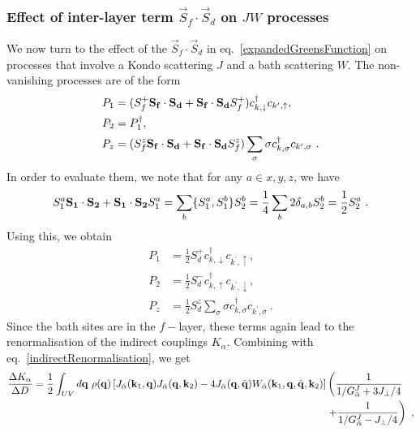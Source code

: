 \documentclass[%
reprint,
superscriptaddress,
groupedaddress,
superscriptaddress,
onecolumn,
10pt
]{revtex4-2}
\begin{document}
\subsubsection*{Effect of inter-layer term \(\vec{S}_f\cdot\vec{S}_d\) on \(JW\) processes}
We now turn to the effect of the \(\vec{S}_f\cdot\vec{S}_d\) in eq.~\ref{expandedGreensFunction} on processes that involve a Kondo scattering \(J\) and a bath scattering \(W\). The non-vanishing processes are of the form
\begin{equation}\begin{aligned}
	P_1 &= (S_f^+ {\bf S_f}\cdot {\bf S_d} + {\bf S_f}\cdot {\bf S_d}S_f^+ )c^\dagger_{k,\downarrow}c_{k^\prime,\uparrow},\\
	P_2 &= P_1^\dagger,\\
	P_z &= (S_f^z {\bf S_f}\cdot {\bf S_d} + {\bf S_f}\cdot {\bf S_d}S_f^z )\sum_\sigma \sigma c^\dagger_{k,\sigma}c_{k^\prime,\sigma}~.
\end{aligned}\end{equation}
In order to evaluate them, we note that for any \(a\in{x,y,z}\), we have
\begin{equation}\begin{aligned}
	S_1^a {\bf S_1}\cdot {\bf S_2} + {\bf S_1}\cdot {\bf S_2} S_1^a = \sum_b \{S_1^a, S_1^b\}S_2^b = \frac{1}{4}\sum_b 2 \delta_{a,b} S_2^b = \frac{1}{2}S_2^a~.
\end{aligned}\end{equation}
Using this, we obtain
\begin{equation}\begin{aligned}
	P_1 &= \frac{1}{2}S_d^+c^\dagger_{k,\downarrow}c_{k^\prime,\uparrow},\\
	P_2 &= \frac{1}{2}S_d^-c^\dagger_{k,\uparrow}c_{k^\prime,\downarrow},\\
	P_z &= \frac{1}{2}S_d^z \sum_\sigma \sigma c^\dagger_{k,\sigma}c_{k^\prime,\sigma}~.
\end{aligned}\end{equation}
Since the bath sites are in the \(f-\)layer, these terms again lead to the renormalisation of the indirect couplings \(K_\alpha\). Combining with eq.~\ref{indirectRenormalisation}, we get
\begin{equation}\begin{aligned}\label{indirectRenorm}
	\frac{\Delta K_\alpha}{\Delta D} = \frac{1}{2}\int_{UV} d{\bf q} ~\rho({\bf q}) \left[J_{\bar\alpha}({\bf k}_1, {\bf q})J_{\bar\alpha}({\bf q}, {\bf k}_2) - 4J_{\bar\alpha}({\bf q}, \bar {\bf q})W_{\bar\alpha}({\bf k}_1, {\bf q}, \bar {\bf q}, {\bf k}_2)\right]& \left(\frac{1}{1/G_{\bar\alpha}^J + 3J_\perp/4}\right.\\
&\left.+ \frac{1}{1/G_{\bar\alpha}^J - J_\perp/4}\right)~,
\end{aligned}\end{equation}
\end{document}
